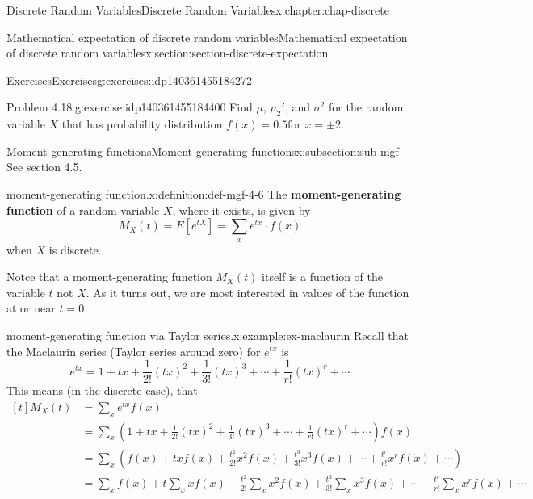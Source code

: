 \documentclass[oneside,10pt,]{book}
\newcommand{\terminology}[1]{\textbf{#1}}
\numberwithin{equation}{section}
\newcommand{\amp}{&}
\begin{document}
\begin{chapterptx}{Discrete Random Variables}{}{Discrete Random Variables}{}{}{x:chapter:chap-discrete}
\begin{sectionptx}{Mathematical expectation of discrete random variables}{}{Mathematical expectation of discrete random variables}{}{}{x:section:section-discrete-expectation}
\begin{exercises-subsection}{Exercises}{}{Exercises}{}{}{g:exercises:idp140361455184272}
\begin{divisionexercise}{1}{Problem 4.18.}{}{g:exercise:idp140361455184400}
Find \(\mu\), \(\mu_2'\), and \(\sigma^2\) for the random variable \(X\) that has probability distribution \(f(x) = 0.5 \text{
for } x= \pm 2\).%
\end{divisionexercise}%
\end{exercises-subsection}
%
%
\typeout{************************************************}
\typeout{************************************************}
%
\begin{subsectionptx}{Moment-generating functions}{}{Moment-generating functions}{}{}{x:subsection:sub-mgf}
See section 4.5.%
\begin{definition}{moment-generating function.}{x:definition:def-mgf-4-6}%
The \terminology{moment-generating function} of a random variable \(X\), where it exists, is given by%
\begin{equation*}
\displaystyle
M_X(t) = E[e^{tX}] = \sum_x e^{tx}\cdot f(x)
\end{equation*}
when \(X\) is discrete.%
\end{definition}
Notce that a moment-generating function \(\displaystyle M_X(t)\) itself is a function of the variable \(\displaystyle t\) not \(X\). As it turns out, we are most interested in values of the function at or near \(\displaystyle t=0\).%
\begin{example}{moment-generating function via Taylor series.}{x:example:ex-maclaurin}%
Recall that the Maclaurin series (Taylor series around zero) for \(\displaystyle e^{tx}\) is%
\begin{equation*}
e^{tx} = 1 + tx +
\frac{1}{2!}\left(tx\right)^2 + \frac{1}{3!}\left(tx\right)^3 + \cdots +
\frac{1}{r!}\left(tx\right)^r + \cdots
\end{equation*}
This means (in the discrete case), that%
\begin{equation*}
\begin{aligned}[t]
M_X(t) \amp = \sum_x e^{tx} f(x)\\
\amp = \sum_x \left(1 + tx + \frac{1}{2!}(tx)^2 +
\frac{1}{3!}\left(tx\right)^3 + \cdots + \frac{1}{r!}\left(tx\right)^r +
\cdots\right) f(x)\\
\amp = \sum_x (f(x) + txf(x) + \frac{t^2}{2!}x^2f(x) +
\frac{t^3}{3!}x^3f(x) + \cdots + \frac{t^r}{r!}x^rf(x) + \cdots)\\
\amp = \sum_xf(x) + t\sum_x xf(x) + \frac{t^2}{2!}\sum_x x^2f(x) +
\frac{t^3}{3!}\sum_x x^3f(x) + \cdots + \frac{t^r}{r!}\sum_x x^rf(x) +
\cdots
\end{aligned}
\end{equation*}

\end{example}
\end{subsectionptx}
\end{sectionptx}
\end{chapterptx}
\end{document}
